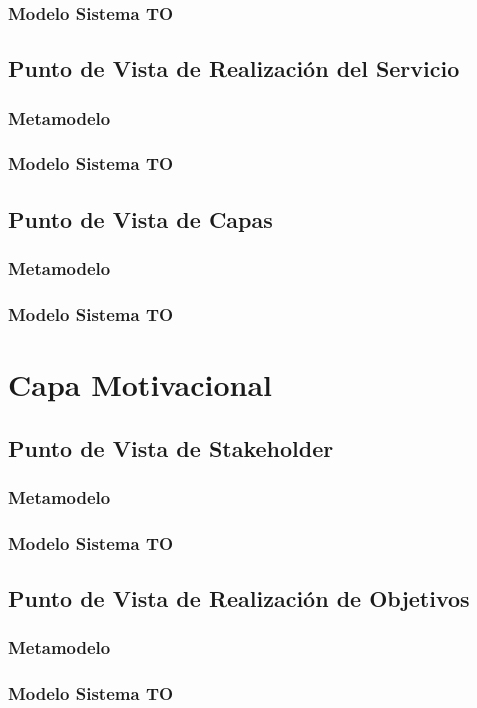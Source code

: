 		\subsubsection{Modelo Sistema TO}
    \subsection{Punto de Vista de Realización del Servicio}
		\subsubsection{Metamodelo}
		\subsubsection{Modelo Sistema TO}
    \subsection{Punto de Vista de Capas}
		\subsubsection{Metamodelo}
		\subsubsection{Modelo Sistema TO}
  \section{Capa Motivacional}
    \subsection{Punto de Vista de Stakeholder}
		\subsubsection{Metamodelo}
		\subsubsection{Modelo Sistema TO}
    \subsection{Punto de Vista de Realización de Objetivos}
		\subsubsection{Metamodelo}
		\subsubsection{Modelo Sistema TO}
